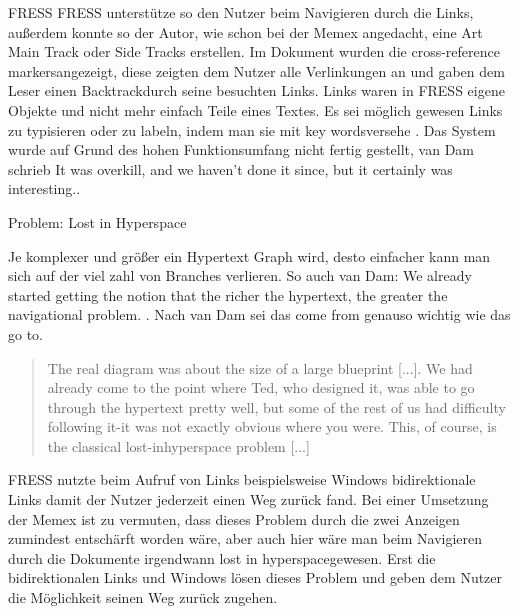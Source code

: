 \begin{section}{FRESS}
FRESS unterstütze so den Nutzer beim Navigieren durch die Links, außerdem konnte so der Autor, wie schon bei der Memex angedacht, eine Art Main Track oder Side Tracks erstellen. Im Dokument wurden die \glqq cross-reference markers\grqq{ }angezeigt, diese zeigten dem Nutzer alle Verlinkungen an und gaben dem Leser einen \glqq Backtrack\grqq{ }durch seine besuchten Links. Links waren in FRESS eigene Objekte und nicht mehr einfach Teile eines Textes. Es sei möglich gewesen Links zu typisieren oder zu labeln, indem man sie mit \glqq key words\grqq{ }versehe \cite[S.891]{Dam1988}. Das System wurde auf Grund des hohen Funktionsumfang nicht fertig gestellt, van Dam schrieb \glqq It was overkill, and we haven’t done it since, but it certainly was interesting.\grqq{ }\cite[S.891]{Dam1988}.

\end{section}

\begin{section}{Problem: Lost in Hyperspace}
\label{sec:lostInHyperspace}

Je komplexer und größer ein Hypertext Graph wird, desto einfacher kann man sich auf der viel zahl von Branches verlieren. So auch van Dam: \glqq We already started getting the notion that the richer the hypertext, the greater the navigational problem. \grqq{ }. Nach van Dam sei das \glqq come from\grqq{ } genauso wichtig wie das \glqq go to\grqq{ }\cite{Dam1988}.

\begin{quote}
\glqq [...] The real diagram was about the size of a large blueprint [...]. We had already come to the point where Ted, who designed it, was able to go through the hypertext pretty well, but some of the rest of us had difficulty following it-it was not exactly obvious where you were. This, of course, is the classical lost-inhyperspace problem [...]\grqq{ }\cite{Dam1988}
\end{quote}

FRESS nutzte beim Aufruf von Links beispielsweise Windows bidirektionale Links damit der Nutzer jederzeit einen Weg zurück fand. Bei einer Umsetzung der Memex ist zu vermuten, dass dieses Problem durch die zwei Anzeigen zumindest entschärft worden wäre, aber auch hier wäre man beim Navigieren durch die Dokumente irgendwann \glqq lost in hyperspace\grqq gewesen. Erst die bidirektionalen Links und Windows lösen dieses Problem und geben dem Nutzer die Möglichkeit seinen Weg zurück zugehen.

\end{section}

